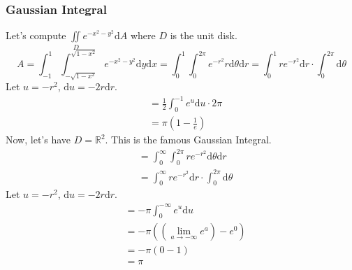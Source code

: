 \subsubsection{Gaussian Integral}
\noindent
Let's compute $\iint\limits_{D}{e^{-x^2-y^2}\mathrm{d}A}$ where $D$ is the unit disk.
\begin{equation*}
	A = \int_{-1}^{1}{\int_{-\sqrt{1 - x^2}}^{\sqrt{1 - x^2}}{e^{-x^2 - y^2}\mathrm{d}y}\mathrm{d}x} = \int_{0}^{1}{\int_{0}^{2\pi}{e^{-r^2}r\mathrm{d}\theta}\mathrm{d}r} = \int_{0}^{1}{re^{-r^2}\mathrm{d}r} \cdot \int_{0}^{2\pi}{\mathrm{d}\theta}
\end{equation*}
Let $u = -r^2$, $\mathrm{d} u =-2r\mathrm{d}r$.\\
\begin{align*}
	&= \frac{1}{2}\int_{0}^{-1}{e^u\mathrm{d}u} \cdot 2\pi	\\
	&= \pi\left(1 - \frac{1}{e}\right)
\end{align*}
Now, let's have $D = \mathbb{R}^2$. This is the famous Gaussian Integral.
\begin{align*}
	&= \int_{0}^{\infty}{\int_{0}^{2\pi}{re^{-r^2}\mathrm{d}\theta}\mathrm{d}r} \\
	&= \int_{0}^{\infty}{re^{-r^2}\mathrm{d}r} \cdot \int_{0}^{2\pi}{\mathrm{d}\theta}
\end{align*}
Let $ u =-r^2$, $\mathrm{d}u = -2r\mathrm{d}r$.
\begin{align*}
	&= -\pi\int_{0}^{-\infty}{e^{u}\mathrm{d}u} \\
	&= -\pi\left(\left(\lim_{a\to -\infty}{e^{a}}\right) - e^0\right) \\
	&= -\pi\left(0 - 1\right) \\
	&= \pi
\end{align*}
